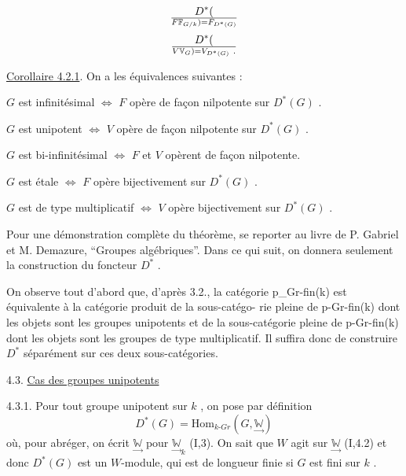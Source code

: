 
\margin{$\times$} 
\[ D^*(\over{F}{\mathbb{F}}_{G/k}) = F_{D^*(G)} \]
\[ D^*(\over{V}{\mathbb{V}}_G) = V_{D^*(G)} \ . \]

\uline{Corollaire 4.2.1}. On a les équivalences suivantes :

$G$ est infinitésimal $\Longleftrightarrow$ $F$ opère de façon nilpotente sur $D^*(G)$ .

$G$ est unipotent $\Longleftrightarrow$ $V$ opère de façon nilpotente sur $D^*(G)$ .

$G$ est bi-infinitésimal $\Longleftrightarrow$ $F$ et $V$ opèrent de façon nilpotente.

$G$ est étale $\Longleftrightarrow$ $F$ opère bijectivement sur $D^*(G)$ .

$G$ est de type multiplicatif $\Longleftrightarrow$ $V$ opère bijectivement sur $D^*(G)$ .

Pour une démonstration complète du théorème, se reporter
au livre de P. Gabriel et M. Demazure, ``Groupes algébriques''. Dans ce
qui suit, on donnera seulement la construction du foncteur $D^*$ .

On observe tout d'abord que, d'après 3.2., la catégorie
p\_Gr-fin(k) est équivalente à la catégorie produit de la sous-catégo-%
rie pleine de p-Gr-fin(k) dont les objets sont les groupes unipotents
et de la sous-catégorie pleine de p-Gr-fin(k) dont les objets sont
les groupes de type multiplicatif. Il suffira donc de construire $D^*$
séparément sur ces deux sous-catégories.

4.3. \uline{Cas des groupes unipotents}

4.3.1. Pour tout groupe unipotent sur $k$ , on pose par définition
\[ D^*(G) = \mathrm{Hom}_{k\text{-}Gr}(G,\underset{\rightarrow}{\mathbb{W}}) \]
où, pour abréger, on écrit $\underset{\rightarrow}{\mathbb{W}}$ pour $\underset{\rightarrow}{\mathbb{W}}_k$ (I,3). On sait que $W$ agit sur
$\underset{\rightarrow}{\mathbb{W}}$ (I,4.2) et donc $D^*(G)$ est un $W$-module, qui est de longueur finie si
$G$ est fini sur $k$ .

